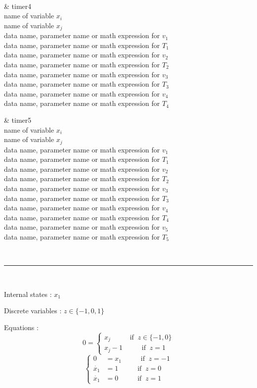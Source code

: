 ~

\hspace*{-8ex}\parbox[t]{100mm}{\sf 
\& timer4\\
name of variable $x_i$\\
name of variable $x_j$\\
data name, parameter name or math expression for $v_1$\\
data name, parameter name or math expression for $T_1$\\
data name, parameter name or math expression for $v_2$\\
data name, parameter name or math expression for $T_2$\\
data name, parameter name or math expression for $v_3$\\
data name, parameter name or math expression for $T_3$\\
data name, parameter name or math expression for $v_4$\\
data name, parameter name or math expression for $T_4$
}\parbox[t]{95mm}{\sf 
\& timer5\\
name of variable $x_i$\\
name of variable $x_j$\\
data name, parameter name or math expression for $v_1$\\
data name, parameter name or math expression for $T_1$\\
data name, parameter name or math expression for $v_2$\\
data name, parameter name or math expression for $T_2$\\
data name, parameter name or math expression for $v_3$\\
data name, parameter name or math expression for $T_3$\\
data name, parameter name or math expression for $v_4$\\
data name, parameter name or math expression for $T_4$\\
data name, parameter name or math expression for $v_5$\\
data name, parameter name or math expression for $T_5$
}

~ \hrule ~

Internal states : $x_1$

Discrete variables : $z \in \{-1,0,1\}$

Equations :
\begin{equation*}
0 =
\begin{cases}
x_j \;\;\;\;\;\;\;\;\;\; \mbox{if} \;\; z \in \{-1,0 \} \\
x_j-1 \;\;\;\;\;\;\;\;\;\; \mbox{if} \;\; z = 1
\end{cases} 
\end{equation*}
\begin{equation*}
\begin{cases}
0 & = x_1 \;\;\;\;\;\;\;\;\;\; \mbox{if} \;\; z = -1 \\
\dot{x_1} & =  1 \;\;\;\;\;\;\;\;\;\; \mbox{if} \;\; z = 0 \\
\dot{x_1} & =  0 \;\;\;\;\;\;\;\;\;\; \mbox{if} \;\; z = 1
\end{cases}
\end{equation*}

